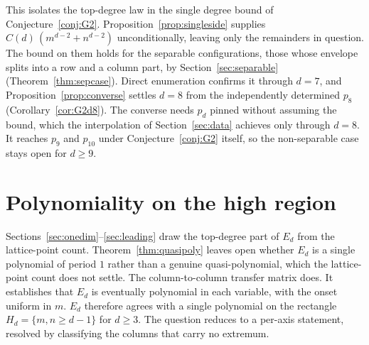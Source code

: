 \documentclass[11pt]{article}
\theoremstyle{definition}
\theoremstyle{remark}
\begin{document}
This isolates the top-degree law in the single degree bound of
Conjecture~\ref{conj:G2}. Proposition~\ref{prop:singleside} supplies
$C(d)\,(m^{d-2}+n^{d-2})$ unconditionally, leaving only the remainders in question.
The bound on them holds for the separable configurations, those whose envelope splits
into a row and a column part, by Section~\ref{sec:separable} (Theorem~\ref{thm:sepcase}).
Direct enumeration confirms it through $d=7$, and
Proposition~\ref{prop:converse} settles $d=8$ from the independently determined
$p_8$ (Corollary~\ref{cor:G2d8}). The converse needs $p_d$ pinned without
assuming the bound, which the interpolation of Section~\ref{sec:data} achieves
only through $d=8$. It reaches $p_9$ and $p_{10}$ under Conjecture~\ref{conj:G2}
itself, so the non-separable case stays open for $d\ge9$.

\section{Polynomiality on the high region}\label{sec:period}

Sections~\ref{sec:onedim}--\ref{sec:leading} draw the top-degree
part of $E_d$ from the lattice-point count. Theorem~\ref{thm:quasipoly} leaves
open whether $E_d$ is a single polynomial of period $1$ rather than a genuine
quasi-polynomial, which the lattice-point count does not settle. The
column-to-column transfer matrix does. It establishes that $E_d$ is eventually polynomial in each
variable, with the onset uniform in $m$. $E_d$ therefore agrees with a single polynomial on the rectangle $H_d=\{m,n\ge d-1\}$
for $d\ge3$. The question reduces to a per-axis statement, resolved by classifying
the columns that carry no extremum.
\end{document}
